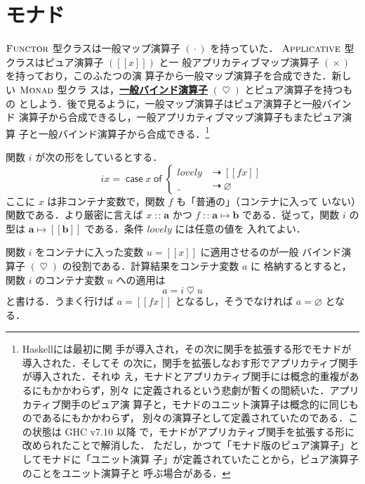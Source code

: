 \documentclass[a5paper,twoside,fleqn,draft]{jsbook}
\def\[{[\![}
\def\]{]\!]}
\newcommand{\programminglanguage}[1]{\textsf{#1}}
\newcommand{\haskell}{\programminglanguage{Haskell}}
\newcommand{\keyword}[1]{{\underline{\textbf{#1}}}}
\newcommand{\mKeyword}[1]{\mathsf{#1}}
\newcommand{\mCaseKeyword}{\mKeyword{case}}
\newcommand{\mOfKeyword}{\mKeyword{of}}
\DeclareMathOperator{\mCaseKW}{\mCaseKeyword}
\DeclareMathOperator{\mOfKW}{\mOfKeyword}
\newcommand{\mPureNothing}{\varnothing}
\newcommand{\mSpecialVar}[1]{\mathit{#1}}
\newcommand{\mLovelyVar}{\mSpecialVar{lovely}}
\DeclareMathOperator{\mAppMap}{\times}
\DeclareMathOperator{\mBind}{\heartsuit}
\DeclareMathOperator{\mFuncArrow}{\mapsto}
\DeclareMathOperator{\mIfSo}{\dashrightarrow}
\DeclareMathOperator{\mIn}{{:\!:}}
\DeclareMathOperator{\mMap}{\cdot}
\newcommand{\mType}[1]{\mathbf{#1}} %
\newcommand{\mA}{\mType{a}}
\newcommand{\mB}{\mType{b}}
\newcommand{\mPureType}[1]{\[\mType{#1}\]}
\newcommand{\mPureWith}[1]{\[#1\]}
\newcommand{\mTypeClass}[1]{\textsc{#1}} %
\newcommand{\mApplicativeTypeClass}{\mTypeClass{Applicative}}
\newcommand{\mFunctorTypeClass}{\mTypeClass{Functor}}
\newcommand{\mMonadTypeClass}{\mTypeClass{Monad}}
\newcommand{\mCaseOf}[1]{\mCaseKW#1\mOfKW}
\begin{document}
\section{モナド}

$\mFunctorTypeClass$ 型クラスは一般マップ演算子 $(\mMap)$ を持っていた．
$\mApplicativeTypeClass$ 型クラスはピュア演算子 $(\mPureWith{x})$ と一
般アプリカティブマップ演算子 $(\mAppMap)$ を持っており，このふたつの演
算子から一般マップ演算子を合成できた．新しい $\mMonadTypeClass$ 型クラ
スは，\keyword{一般バインド演算子} $(\mBind)$ とピュア演算子を持つもの
としよう．後で見るように，一般マップ演算子はピュア演算子と一般バインド
演算子から合成できるし，一般アプリカティブマップ演算子もまたピュア演算
子と一般バインド演算子から合成できる．\footnote{\haskell には最初に関
手が導入され，その次に関手を拡張する形でモナドが導入された．そしてそ
の次に，関手を拡張しなおす形でアプリカティブ関手が導入された．それゆ
え，モナドとアプリカティブ関手には概念的重複があるにもかかわらず，別々
に定義されるという悲劇が暫くの間続いた．アプリカティブ関手のピュア演
算子と，モナドのユニット演算子は概念的に同じものであるにもかかわらず，
別々の演算子として定義されていたのである．この状態は GHC v7.10 以降
で，モナドがアプリカティブ関手を拡張する形に改められたことで解消した．
ただし，かつて「モナド版のピュア演算子」としてモナドに「ユニット演算
子」が定義されていたことから，ピュア演算子のことをユニット演算子と
呼ぶ場合がある．}

関数 $i$ が次の形をしているとする．
\begin{equation}
  \label{eq:def-of-i}
  ix=\mCaseOf{x}\begin{cases}
    \mLovelyVar
    &\mIfSo\mPureWith{fx}\\
    \_
    &\mIfSo\mPureNothing
  \end{cases}
\end{equation}
ここに $x$ は非コンテナ変数で，関数 $f$ も「普通の」（コンテナに入って
  いない）関数である．より厳密に言えば $x\mIn\mA$ かつ
$f\mIn\mA\mFuncArrow\mB$ である．従って，関数 $i$ の型は
$\mA\mFuncArrow\mPureType{b}$ である．条件 $\mLovelyVar$ には任意の値を
  入れてよい．

関数 $i$ をコンテナに入った変数 $u=\mPureWith{x}$ に適用させるのが一般
バインド演算子 $(\mBind)$ の役割である．計算結果をコンテナ変数 $a$ に
格納するとすると，関数 $i$ のコンテナ変数 $u$ への適用は
\begin{equation}
\label{eq:i-love-u}
a=i\mBind u
\end{equation}
と書ける．うまく行けば $a=\mPureWith{fx}$ となるし，そうでなければ
$a=\mPureNothing$ となる．
\end{document}
